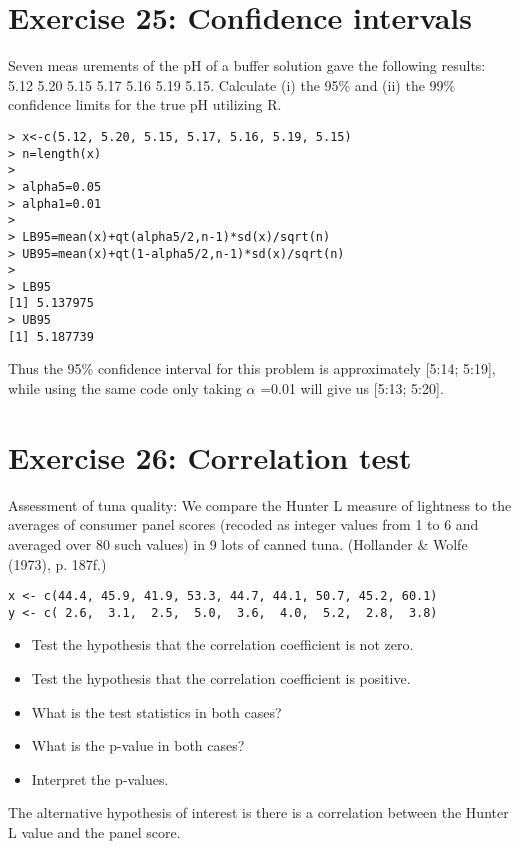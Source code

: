 \documentclass{article}
\begin{document}
\section*{Exercise 25: Confidence intervals}
Seven meas urements of the pH of a buffer solution gave the following results:
5.12 5.20 5.15 5.17 5.16 5.19 5.15. Calculate (i) the 95\% and (ii) the 99\% confidence limits for the true pH
utilizing R.

\begin{verbatim}
> x<-c(5.12, 5.20, 5.15, 5.17, 5.16, 5.19, 5.15)
> n=length(x)
>
> alpha5=0.05
> alpha1=0.01
>
> LB95=mean(x)+qt(alpha5/2,n-1)*sd(x)/sqrt(n)
> UB95=mean(x)+qt(1-alpha5/2,n-1)*sd(x)/sqrt(n)
>
> LB95
[1] 5.137975
> UB95
[1] 5.187739

\end{verbatim}

Thus the 95\% confidence interval for this problem is approximately [5:14; 5:19], while
using the same code only taking $\alpha$ =0.01 will give us [5:13; 5:20].

\newpage
\section*{Exercise 26: Correlation test}

Assessment of tuna quality: We compare the Hunter L measure of
lightness to the averages of consumer panel scores (recoded as
integer values from 1 to 6 and averaged over 80 such values) in
 9 lots of canned tuna.
(Hollander \& Wolfe (1973), p. 187f.)

\begin{verbatim}
x <- c(44.4, 45.9, 41.9, 53.3, 44.7, 44.1, 50.7, 45.2, 60.1)
y <- c( 2.6,  3.1,  2.5,  5.0,  3.6,  4.0,  5.2,  2.8,  3.8)
\end{verbatim}

\begin{itemize}

\item Test the hypothesis that the correlation coefficient is not zero.
\item Test the hypothesis that the correlation coefficient is positive.
\item What is the test statistics in both cases?
\item What is the p-value in both cases?
\item Interpret the p-values.
\end{itemize}


The alternative hypothesis of interest is there is a correlation between the
Hunter L value and the panel score.
\end{document}
